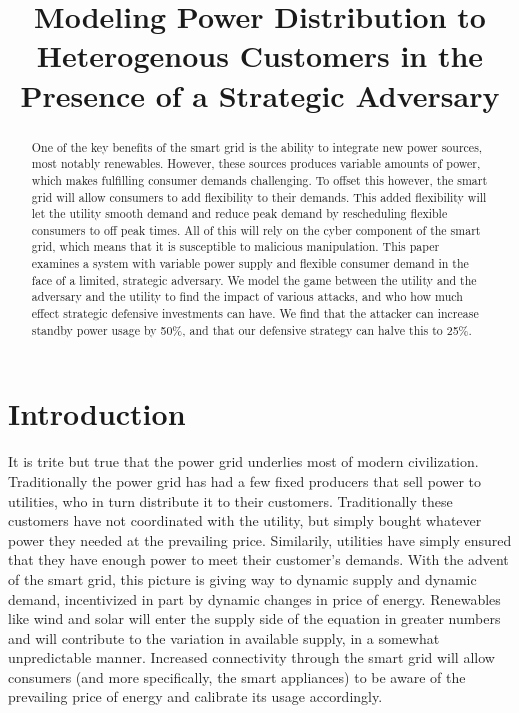 \documentclass[conference]{IEEEtran}
\begin{document}
\title{Modeling Power Distribution to Heterogenous Customers in the Presence of a Strategic Adversary}

\author{
}

\maketitle

\begin{abstract}
One of the key benefits of the smart grid is the ability to integrate new power sources, most notably renewables.  However, these sources produces variable amounts of power, which makes fulfilling consumer demands challenging.  To offset this however, the smart grid will allow consumers to add flexibility to their demands.  This added flexibility will let the utility smooth demand and reduce peak demand by rescheduling flexible consumers to off peak times.  All of this will rely on the cyber component of the smart grid, which means that it is susceptible to malicious manipulation.  This paper examines a system with variable power supply and flexible consumer demand in the face of a limited, strategic adversary.  We model the game between the utility and the adversary and the utility to find the impact of various attacks, and who how much effect strategic defensive investments can have.  We find that the attacker can increase standby power usage by 50\%, and that our defensive strategy can halve this to 25\%.

\end{abstract}

\section{Introduction}
\label{Introduction}

It is trite but true that the power grid underlies most of modern civilization.  Traditionally the power grid has had a 
few fixed producers that sell power to utilities, who in turn distribute it to their customers.  Traditionally these 
customers have not coordinated with the utility, but simply bought whatever power they needed at the prevailing price.  
Similarily, utilities have simply ensured that they have enough power to meet their customer's demands.  
With the advent of the smart grid, this picture is giving way to dynamic supply and dynamic demand, incentivized in part by dynamic changes in price of energy.  Renewables like wind and solar will enter the supply side of the equation in greater numbers and will contribute to the variation in available supply, in a somewhat unpredictable manner. Increased connectivity through the smart grid will allow consumers (and more specifically, the smart appliances) to be 
aware of the prevailing price of energy and calibrate its usage accordingly. 
\end{document}
